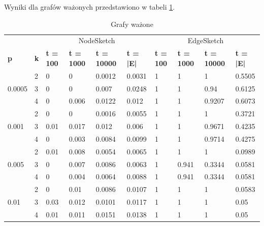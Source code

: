     Wyniki dla grafów ważonych przedstawiono w tabeli \ref{tab:weighted_graphs}.

    \begin{table}[!ht]
        \small
        \centering
        \begin{tabular}{|l|l|l|l|l|l|l|l|l|l|}
        \hline
        & & \multicolumn{4}{c|}{NodeSketch} & \multicolumn{4}{c|}{EdgeSketch} \\ \cline{1-10}
                \textbf{p} & \textbf{k} & \textbf{t = 100} & \textbf{t = 1000} & \textbf{t = 10000} & \textbf{t = |E|} & \textbf{t = 100} & \textbf{t = 1000} & \textbf{t = 10000} & \textbf{t = |E|} \\ \hline\hline
            \multirow{3}{*}{0.0005} & 2 & 0 & 0 & 0.0012 & 0.0031 & 1 & 1 & 1 & 0.5505 \\ \cline{2-10}
            & 3 & 0 & 0 & 0.007 & 0.0248 & 1 & 1 & 0.94 & 0.6125 \\ \cline{2-10}
            & 4 & 0 & 0.006 & 0.0122 & 0.012 & 1 & 1 & 0.9207 & 0.6073 \\ \hline\hline
            \multirow{3}{*}{0.001} & 2 & 0 & 0 & 0.0016 & 0.0055 & 1 & 1 & 1 & 0.3721 \\ \cline{2-10}
            & 3 & 0.01 & 0.017 & 0.012 & 0.006 & 1 & 1 & 0.9671 & 0.4235 \\ \cline{2-10}
            & 4 & 0 & 0.003 & 0.0084 & 0.0099 & 1 & 1 & 0.9714 & 0.4275 \\ \hline\hline
            \multirow{3}{*}{0.005} & 2 & 0.01 & 0.008 & 0.0054 & 0.0065 & 1 & 1 & 1 & 0.0989 \\ \cline{2-10}
            & 3 & 0 & 0.007 & 0.0086 & 0.0063 & 1 & 0.941 & 0.3344 & 0.0581 \\ \cline{2-10}
            & 4 & 0 & 0.004 & 0.0064 & 0.0088 & 1 & 0.941 & 0.3344 & 0.0581 \\ \hline\hline
            \multirow{3}{*}{0.01} & 2 & 0 & 0.01 & 0.0086 & 0.0107 & 1 & 1 & 1 & 0.0583 \\ \cline{2-10}
            & 3 & 0.03 & 0.012 & 0.0101 & 0.0117 & 1 & 1 & 1 & 0.05 \\ \cline{2-10}
            & 4 & 0.01 & 0.011 & 0.0151 & 0.0138 & 1 & 1 & 1 & 0.05 \\ \hline
        \end{tabular}
        \caption{Grafy ważone}
        \label{tab:weighted_graphs}
    \end{table}

